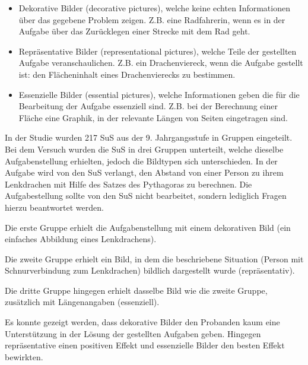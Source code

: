     \begin{itemize}
        \item Dekorative Bilder (decorative pictures), welche keine echten Informationen über das gegebene Problem zeigen. Z.B. eine Radfahrerin, wenn es in der Aufgabe über das Zurücklegen einer Strecke mit dem Rad geht.
        \item Repräsentative Bilder (representational pictures), welche Teile der gestellten Aufgabe veranschaulichen. Z.B. ein Drachenviereck, wenn die Aufgabe gestellt ist: den Flächeninhalt eines Drachenvierecks zu bestimmen. 
        \item Essenzielle Bilder (essential pictures), welche Informationen geben die für die Bearbeitung der Aufgabe essenziell sind. Z.B. bei der Berechnung einer Fläche eine Graphik, in der relevante Längen von Seiten eingetragen sind.
    \end{itemize}

In der Studie wurden 217 \gls{SuS} aus der 9. Jahrgangsstufe in Gruppen eingeteilt. Bei dem Versuch wurden die \gls{SuS} in drei Gruppen unterteilt, welche dieselbe Aufgabenstellung erhielten, jedoch die Bildtypen sich unterschieden. In der Aufgabe wird von den \gls{SuS} verlangt, den Abstand von einer Person zu ihrem Lenkdrachen mit Hilfe des Satzes des Pythagoras zu berechnen. Die Aufgabestellung sollte von den \gls{SuS} nicht bearbeitet, sondern lediglich Fragen hierzu beantwortet werden. 


Die erste Gruppe erhielt die Aufgabenstellung mit einem dekorativen Bild (ein einfaches Abbildung eines Lenkdrachens).


Die zweite Gruppe erhielt ein Bild, in dem die beschriebene Situation (Person mit Schnurverbindung zum Lenkdrachen) bildlich dargestellt wurde (repräsentativ).


Die dritte Gruppe hingegen erhielt dasselbe Bild wie die zweite Gruppe, zusätzlich mit Längenangaben (essenziell).


Es konnte gezeigt werden, dass dekorative Bilder den Probanden kaum eine Unterstützung in der Lösung der gestellten Aufgaben geben. Hingegen repräsentative einen positiven Effekt und essenzielle Bilder den besten Effekt bewirkten\cite{bockmannvalue}.

